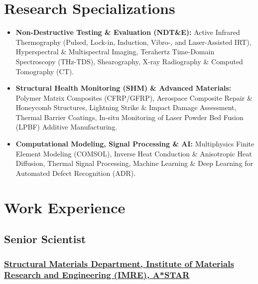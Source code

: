 \documentclass{my_cv}%
\begin{document}
\section{Research Specializations}
\vspace{0.6em}
\begin{itemize}[leftmargin=0.15in]
\setlength\itemsep{-0.1em}
\color{mygray}
\item \textbf{Non-Destructive Testing \& Evaluation (NDT\&E):} Active Infrared Thermography (Pulsed, Lock-in, Induction, Vibro-, and Laser-Assisted IRT), Hyperspectral \& Multispectral Imaging, Terahertz Time-Domain Spectroscopy (THz-TDS), Shearography, X-ray Radiography \& Computed Tomography (CT).
\item \textbf{Structural Health Monitoring (SHM) \& Advanced Materials:} Polymer Matrix Composites (CFRP/GFRP), Aerospace Composite Repair \& Honeycomb Structures, Lightning Strike \& Impact Damage Assessment, Thermal Barrier Coatings, In-situ Monitoring of Laser Powder Bed Fusion (LPBF) Additive Manufacturing.
\item \textbf{Computational Modeling, Signal Processing \& AI:} Multiphysics Finite Element Modeling (COMSOL), Inverse Heat Conduction \& Anisotropic Heat Diffusion, Thermal Signal Processing, Machine Learning \& Deep Learning for Automated Defect Recognition (ADR).
\end{itemize}

\section{Work Experience}
\vspace{0.6em}
\subsection{Senior Scientist}
\subsubsection{\href{https://www.a-star.edu.sg/imre}{Structural Materials Department, Institute of Materials Research and Engineering (IMRE), A*STAR}}
\end{document}
